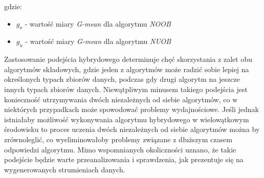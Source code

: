 \noindent gdzie:

\begin{itemize}
    \item $g_o$ - wartość miary \textit{G-mean} dla algorytmu \textit{NOOB}
    \item $g_u$ - wartość miary \textit{G-mean} dla algorytmu \textit{NUOB}
\end{itemize}

\noindent Zastosowanie podejścia hybrydowego determinuje chęć skorzystania z zalet obu algorytmów składowych, gdzie jeden z algorytmów może radzić sobie lepiej na określonych typach zbiorów danych, podczas gdy drugi algorytm na jeszcze innych typach zbiorów danych. Niewątpliwym minusem takiego podejścia jest konieczność utrzymywania dwóch niezależnych od siebie algorytmów, co w niektórych przypadkach może spowodować problemy wydajnościowe. Jeśli jednak istniałaby możliwość wykonywania algorytmu hybrydowego w wielowątkowym środowisku to proces uczenia dwóch niezależnych od siebie algorytmów można by zrównoleglić, co wyeliminowałoby problemy związane z dłuższym czasem odpowiedzi algorytmu. Mimo wspomnianych okoliczności uznano, że takie podejście będzie warte przeanalizowania i sprawdzenia, jak prezentuje się na wygenerowanych strumieniach danych.